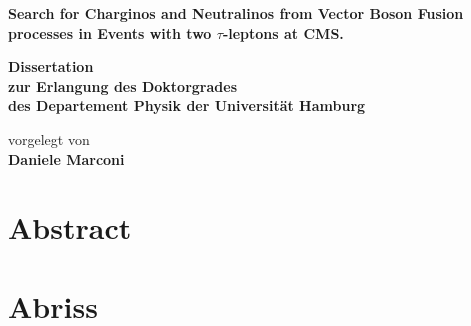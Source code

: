 \documentclass[
twoside=false,
headsepline,     %
headings=normal,
open=any,
numbers=noenddot, %
numbering %
]{scrreprt} %
\author{Daniele Marconi}
\begin{document}
\begin{titlepage}
  \begin{center}
    \thispagestyle{empty}
    \vspace*{1cm}
    \begin{doublespace} 
      \textbf{\huge
Search for Charginos and Neutralinos from Vector 
Boson Fusion processes in Events with two $\tau$-leptons
at CMS.}
      \vskip2.5cm
      \begin{Large} 
        \textbf{Dissertation\\
          zur Erlangung des Doktorgrades\\
          des Departement Physik
          der Universit\"{a}t Hamburg\\}
      \end{Large}
      \vskip4cm
      \begin{large}
        vorgelegt von\\
        {\textbf{Daniele Marconi} }
        \vfill
      \end{large}
    \end{doublespace} 
  \end{center}
\end{titlepage}

\newpage
\thispagestyle{empty}

\quad
\vfill
{}

\newpage
\thispagestyle{empty}
\section*{Abstract}

\clearpage
\section*{Abriss}

\newpage 
\thispagestyle{empty}
\quad 
\newpage
\end{document}
